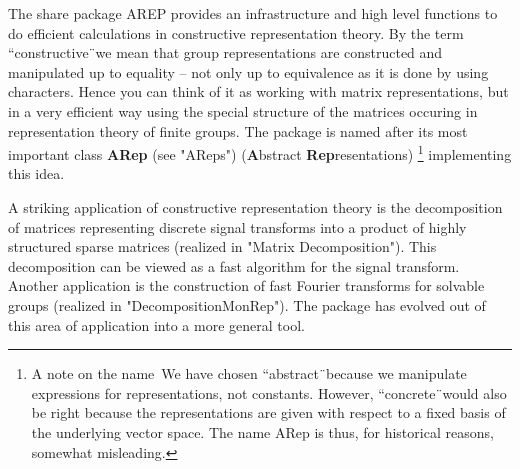 
\newcommand{\AREP}{{\sf AREP}}


The share package {\AREP} provides an infrastructure and high level
functions to do efficient calculations in constructive representation
theory. By the term ``constructive\"\ we mean that group
representations are constructed and manipulated up to equality -- not
only up to equivalence as it is done by using characters. Hence you
can think of it as working with matrix representations, but in a very
efficient way using the special structure of the matrices occuring in
representation theory of finite groups. The package is named after
its most important class {\bf ARep} (see "AReps") ({\bf A}bstract {\bf
Rep}resentations)%
\footnote{%
A note on the name\:\  
We have chosen ``abstract\"\ because we manipulate expressions
for representations, not constants. However, ``concrete\"\ 
would also be right because the representations are given with 
respect to a fixed basis of the underlying vector space. The 
name ARep is thus, for historical reasons, somewhat misleading.
}
implementing this idea.

A striking application of constructive representation theory is the
decomposition of matrices representing discrete signal transforms into
a product of highly structured sparse matrices (realized in 
"Matrix Decomposition"). This decomposition can be viewed as a 
fast algorithm for the signal transform. 
Another application is the construction of
fast Fourier transforms for solvable groups (realized in
"DecompositionMonRep"). The package has evolved out of this area of
application into a more general tool.

